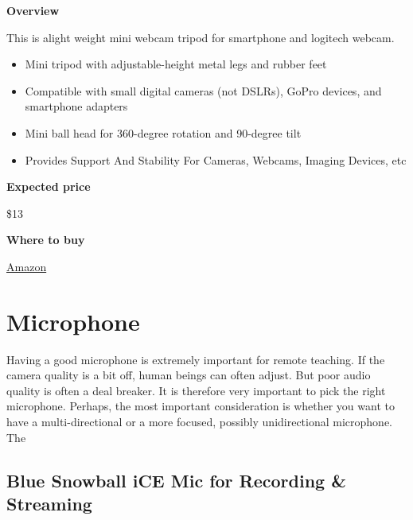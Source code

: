 \begin{gram}

\textbf{Overview}

This is alight weight mini webcam tripod for smartphone and logitech webcam.
%
\begin{itemize}
\item
Mini tripod with adjustable-height metal legs and rubber feet

\item
Compatible with small digital cameras (not DSLRs), GoPro devices, and smartphone adapters 

\item
Mini ball head for 360-degree rotation and 90-degree tilt

\item
Provides Support And Stability For Cameras, Webcams, Imaging Devices, etc

\end{itemize}



\textbf{Expected price}

\$13

\textbf{Where to buy}

\href{https://www.amazon.com/Lightweight-Webcam-Tripod-Logitech-Camera/dp/B076SHC6RN/ref=sr_1_1_sspa?crid=2T6CQ3HNRR1XR&keywords=logitech+c920&qid=1582900721&s=electronics&sprefix=logitech+c,electronics,172&sr=1-1-spons&psc=1&spLa=ZW5jcnlwdGVkUXVhbGlmaWVyPUE1VjVUUFpKTU83QUkmZW5jcnlwdGVkSWQ9QTA1NTk1OTVLT1IyTzdRRFVEWkImZW5jcnlwdGVkQWRJZD1BMDEyNzk2NzEyTDVSOEdSQ1QxTEgmd2lkZ2V0TmFtZT1zcF9hdGYmYWN0aW9uPWNsaWNrUmVkaXJlY3QmZG9Ob3RMb2dDbGljaz10cnVl}{Amazon}

\end{gram}

 
\section{Microphone}

Having a good microphone is extremely important for remote teaching. 
%
If the camera quality is a bit off, human beings can often adjust.
%
But poor audio quality is often a deal breaker.
%
It is therefore very important to pick the right microphone.
%
Perhaps, the most important consideration is whether you want to have a
multi-directional  or a more focused, possibly unidirectional microphone.
%
The  

\subsection{Blue Snowball iCE Mic for Recording \& Streaming}

